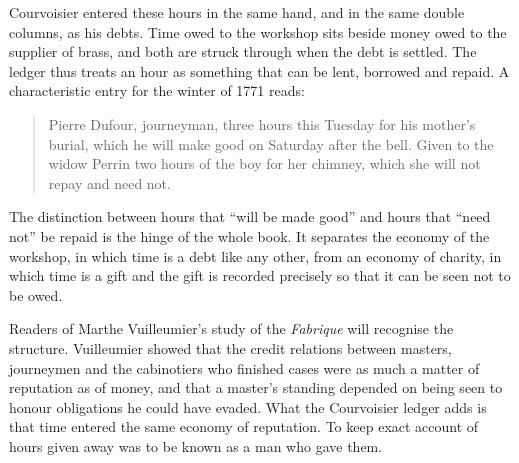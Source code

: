 \documentclass[11pt]{article}
\begin{document}
Courvoisier entered these hours in the same hand, and in the same double
columns, as his debts. Time owed to the workshop sits beside money owed to
the supplier of brass, and both are struck through when the debt is
settled. The ledger thus treats an hour as something that can be lent,
borrowed and repaid. A characteristic entry for the winter of 1771 reads:

\begin{quote}
Pierre Dufour, journeyman, three hours this Tuesday for his mother's
burial, which he will make good on Saturday after the bell. Given to the
widow Perrin two hours of the boy for her chimney, which she will not repay
and need not.\autocite[fol.~38v]{courvoisier1771}
\end{quote}

\noindent The distinction between hours that \enquote{will be made good} and
hours that \enquote{need not} be repaid is the hinge of the whole book. It
separates the economy of the workshop, in which time is a debt like any
other, from an economy of charity, in which time is a gift and the gift is
recorded precisely so that it can be seen not to be owed.

\passagebreak
Readers of Marthe Vuilleumier's study of the \textit{Fabrique} will recognise
the structure. Vuilleumier showed that the credit relations between masters,
journeymen and the cabinotiers who finished cases were as much a matter of
reputation as of money, and that a master's standing depended on being seen
to honour obligations he could have evaded.\autocite[88--112]{vuilleumier1998}
What the Courvoisier ledger adds is that time entered the same economy of
reputation. To keep exact account of hours given away was to be known as a
man who gave them.
\end{document}
